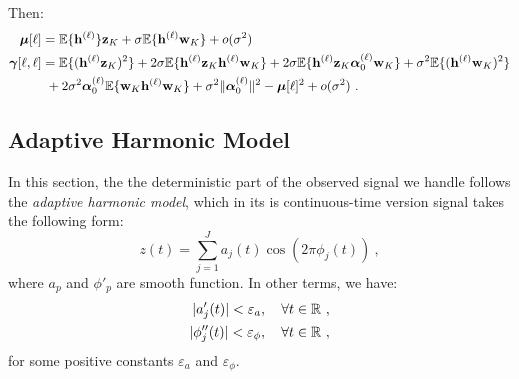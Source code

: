 Then:
\begin{align*}
\boldsymbol{\mu}[\ell] &= {\mathbb E}\{{\mathbf h}^{(\ell)}\}{\mathbf z}_{K} + \sigma{\mathbb E}\{{\mathbf h}^{(\ell)}{\mathbf w}_{K}\} + o(\sigma^2) \\
\boldsymbol{\gamma}[\ell,\ell] &= {\mathbb E}\{({\mathbf h}^{(\ell)}{\mathbf z}_K)^2\} + 2\sigma{\mathbb E}\{{\mathbf h}^{(\ell)}{\mathbf z}_K{\mathbf h}^{(\ell)}{\mathbf w}_K\} + 2\sigma{\mathbb E}\{{\mathbf h}^{(\ell)}{\mathbf z}_K\boldsymbol{\alpha}_0^{(\ell)}{\mathbf w}_K\} + \sigma^2{\mathbb E}\{({\mathbf h}^{(\ell)}{\mathbf w}_K)^2\} \\
&\ + 2\sigma^2\boldsymbol{\alpha}_0^{(\ell)}{\mathbb E}\{{\mathbf w}_K{\mathbf h}^{(\ell)}{\mathbf w}_K\} + \sigma^2\|\boldsymbol{\alpha}_0^{(\ell)}\|^2 - \boldsymbol{\mu}[\ell]^2 + o(\sigma^2)\ .
\end{align*}

\subsection{Adaptive Harmonic Model}
In this section, the the deterministic part of the observed signal we handle follows the \textit{adaptive harmonic model}, which in its is continuous-time version signal takes the following form:
\begin{equation}
z(t) = \sum_{j=1}^J a_j(t)\cos(2\pi\phi_j(t))\ ,
\end{equation}
where $a_p$ and $\phi'_p$ are smooth function. In other terms, we have:
\begin{align}
|a'_j(t)|<\varepsilon_a,\quad\forall t\in{\mathbb R}\ ,\\
|\phi''_j(t)|<\varepsilon_\phi,\quad\forall t\in{\mathbb R}\ ,
\end{align}
for some positive constants $\varepsilon_a$ and $\varepsilon_\phi$.